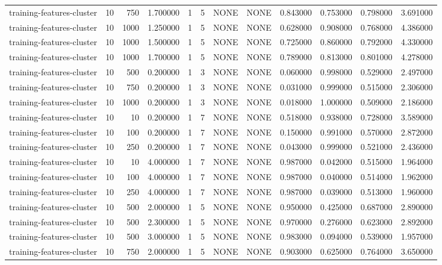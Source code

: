 \begin{tabular}{lrrrllllrrrr}
training-features-cluster & 10 & 750 & 1.700000 & 1 & 5 & NONE & NONE & 0.843000 & 0.753000 & 0.798000 & 3.691000 \\
training-features-cluster & 10 & 1000 & 1.250000 & 1 & 5 & NONE & NONE & 0.628000 & 0.908000 & 0.768000 & 4.386000 \\
training-features-cluster & 10 & 1000 & 1.500000 & 1 & 5 & NONE & NONE & 0.725000 & 0.860000 & 0.792000 & 4.330000 \\
training-features-cluster & 10 & 1000 & 1.700000 & 1 & 5 & NONE & NONE & 0.789000 & 0.813000 & 0.801000 & 4.278000 \\
training-features-cluster & 10 & 500 & 0.200000 & 1 & 3 & NONE & NONE & 0.060000 & 0.998000 & 0.529000 & 2.497000 \\
training-features-cluster & 10 & 750 & 0.200000 & 1 & 3 & NONE & NONE & 0.031000 & 0.999000 & 0.515000 & 2.306000 \\
training-features-cluster & 10 & 1000 & 0.200000 & 1 & 3 & NONE & NONE & 0.018000 & 1.000000 & 0.509000 & 2.186000 \\
training-features-cluster & 10 & 10 & 0.200000 & 1 & 7 & NONE & NONE & 0.518000 & 0.938000 & 0.728000 & 3.589000 \\
training-features-cluster & 10 & 100 & 0.200000 & 1 & 7 & NONE & NONE & 0.150000 & 0.991000 & 0.570000 & 2.872000 \\
training-features-cluster & 10 & 250 & 0.200000 & 1 & 7 & NONE & NONE & 0.043000 & 0.999000 & 0.521000 & 2.436000 \\
training-features-cluster & 10 & 10 & 4.000000 & 1 & 7 & NONE & NONE & 0.987000 & 0.042000 & 0.515000 & 1.964000 \\
training-features-cluster & 10 & 100 & 4.000000 & 1 & 7 & NONE & NONE & 0.987000 & 0.040000 & 0.514000 & 1.962000 \\
training-features-cluster & 10 & 250 & 4.000000 & 1 & 7 & NONE & NONE & 0.987000 & 0.039000 & 0.513000 & 1.960000 \\
training-features-cluster & 10 & 500 & 2.000000 & 1 & 5 & NONE & NONE & 0.950000 & 0.425000 & 0.687000 & 2.890000 \\
training-features-cluster & 10 & 500 & 2.300000 & 1 & 5 & NONE & NONE & 0.970000 & 0.276000 & 0.623000 & 2.892000 \\
training-features-cluster & 10 & 500 & 3.000000 & 1 & 5 & NONE & NONE & 0.983000 & 0.094000 & 0.539000 & 1.957000 \\
training-features-cluster & 10 & 750 & 2.000000 & 1 & 5 & NONE & NONE & 0.903000 & 0.625000 & 0.764000 & 3.650000 \\

\end{tabular}
